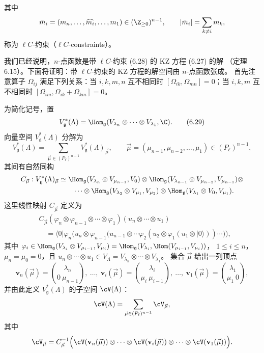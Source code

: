 
其中
\[
\bar{m}_i=(m_n,\dots,\widehat{m_i},\dots,m_1)\in(\Z_{\ge0})^{n-1},\qquad
|\bar{m}_i|=\sum_{k\ne i}m_k ,
\]
称为 $\ell C$-约束（$\ell C$-constraints）。

我们已经说明，$n$-点函数是带 $\ell C$-约束 (6.28) 的 KZ 方程 (6.27) 的解
（定理 6.15）。下面将证明：带 $\ell C$-约束的 KZ 方程的解空间由 $n$-点函数张成。
首先注意算子 $\Omega_{ij}$ 满足下列关系：当 $i,k,m,n$ 互不相同时
$[\Omega_{ik},\Omega_{mn}]=0$；当 $i,k,m$ 互不相同时
$[\Omega_{im},\Omega_{ik}+\Omega_{km}]=0$。

为简化记号，置
\begin{equation}
V^{*}_{\mathfrak{g}}(\Lambda)
=\Hom_{\mathfrak{g}}(V_{\lambda_n}\otimes\cdots\otimes V_{\lambda_1},\C). \tag{6.29}
\end{equation}
向量空间 $V^{*}_{\mathfrak{g}}(\Lambda)$ 分解为
\begin{equation}
V^{*}_{\mathfrak{g}}(\Lambda)=
\sum_{\vec{\mu}\in(P_\ell)^{n-1}}V^{*}_{\mathfrak{g}}(\Lambda)_{\vec{\mu}},
\qquad
\vec{\mu}=(\mu_{n-1},\mu_{n-2},\dots,\mu_1)\in(P_\ell)^{n-1},
\tag{6.30}
\end{equation}
其间有自然同构
\[
\begin{aligned}
C_{\vec{\mu}}:V^{*}_{\mathfrak{g}}(\Lambda)_{\vec{\mu}}
&\simeq\Hom_{\mathfrak{g}}(V_{\lambda_n}\otimes V_{\mu_{n-1}},V_0)
 \otimes\Hom_{\mathfrak{g}}(V_{\lambda_{n-1}}\otimes V_{\mu_{n-2}},
 V_{\mu_{n-1}})\otimes\\
&\qquad\cdots\otimes\Hom_{\mathfrak{g}}(V_{\lambda_2}\otimes V_{\mu_1},
 V_{\mu_2})\otimes\Hom_{\mathfrak{g}}(V_{\lambda_1}\otimes V_0,V_{\mu_1}).
\end{aligned}
\]
这里线性映射 $C_{\vec{\mu}}$ 定义为
\[
\begin{aligned}
&C_{\vec{\mu}}(\varphi_n\otimes\varphi_{n-1}\otimes\cdots\otimes\varphi_1)
 (u_n\otimes\cdots\otimes u_1)\\
&\quad=\langle0|\varphi_n\bigl(u_n\otimes\varphi_{n-1}\bigl(u_{n-1}\otimes
 \cdots\varphi_2(u_2\otimes\varphi_1(u_1\otimes|0\rangle))\cdots\bigr)\bigr),
\end{aligned}
\]
其中
$\varphi_i\in\Hom_{\mathfrak{g}}(V_{\lambda_i}\otimes V_{\mu_{i-1}},V_{\mu_i})
=\Hom_{\mathfrak{g}}(V_{\lambda_i},\Hom(V_{\mu_{i-1}},V_{\mu_i}))$，
$1\le i\le n$，$\mu_n=\mu_0=0$，且
$u_n\otimes\cdots\otimes u_1\in V_\Lambda
=V_{\lambda_n}\otimes\cdots\otimes V_{\lambda_1}$。
集合 $\vec{\mu}$ 给出一列顶点
\[
\mathbf{v}_n(\vec{\mu})=\binom{\lambda_n}{0\ \mu_{n-1}},\ \dots,\
\mathbf{v}_i(\vec{\mu})=\binom{\lambda_i}{\mu_i\ \mu_{i-1}},\ \dots,\
\mathbf{v}_1(\vec{\mu})=\binom{\lambda_1}{\mu_1\ 0},
\]
并由此定义 $V^{*}_{\mathfrak{g}}(\Lambda)$ 的子空间 $\cV(\Lambda)$：
\[
\cV(\Lambda)=\sum_{\vec{\mu}\in(P_\ell)^{n-1}}\cV_{\vec{\mu}},
\]
其中
\[
\cV_{\vec{\mu}}=C^{-1}_{\vec{\mu}}\Bigl(\cV(\mathbf{v}_n(\vec{\mu}))
\otimes\cdots\otimes\cV(\mathbf{v}_i(\vec{\mu}))\otimes\cdots
\otimes\cV(\mathbf{v}_1(\vec{\mu}))\Bigr).
\]

